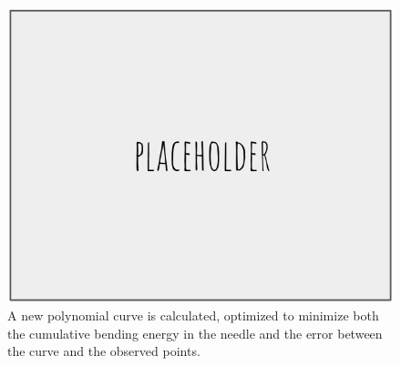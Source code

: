 \begin{figure}[h]
\includegraphics[width=1.0\textwidth]{Fig/placeholder.png}
\caption{A new polynomial curve is calculated, optimized to minimize both the cumulative bending energy in the needle and the error between the curve and the observed points.}
\label{fig:curve_fit_pt3}
\end{figure}

